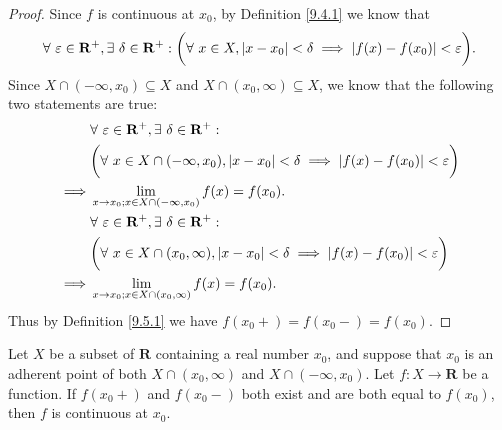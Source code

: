 \begin{proof}
    Since \(f\) is continuous at \(x_0\), by Definition \ref{9.4.1} we know that
    \[
        \forall\ \varepsilon \in \mathbf{R}^+, \exists\ \delta \in \mathbf{R}^+ : \bigg(\forall\ x \in X, \abs*{x - x_0} < \delta \implies \abs*{f(x) - f(x_0)} < \varepsilon\bigg).
    \]
    Since \(X \cap (-\infty, x_0) \subseteq X\) and \(X \cap (x_0, \infty) \subseteq X\), we know that the following two statements are true:
    \begin{align*}
                 & \forall\ \varepsilon \in \mathbf{R}^+, \exists\ \delta \in \mathbf{R}^+ :                                             \\
                 & \bigg(\forall\ x \in X \cap (-\infty, x_0), \abs*{x - x_0} < \delta \implies \abs*{f(x) - f(x_0)} < \varepsilon\bigg) \\
        \implies & \lim_{x \to x_0 ; x \in X \cap (-\infty, x_0)} f(x) = f(x_0).                                                         \\
                 & \forall\ \varepsilon \in \mathbf{R}^+, \exists\ \delta \in \mathbf{R}^+ :                                             \\
                 & \bigg(\forall\ x \in X \cap (x_0, \infty), \abs*{x - x_0} < \delta \implies \abs*{f(x) - f(x_0)} < \varepsilon\bigg)  \\
        \implies & \lim_{x \to x_0 ; x \in X \cap (x_0, \infty)} f(x) = f(x_0).
    \end{align*}
    Thus by Definition \ref{9.5.1} we have \(f(x_0+) = f(x_0-) = f(x_0)\).
\end{proof}

\setcounter{theorem}{2}
\begin{proposition}\label{9.5.3}
    Let \(X\) be a subset of \(\mathbf{R}\) containing a real number \(x_0\), and suppose that \(x_0\) is an adherent point of both \(X \cap (x_0, \infty)\) and \(X \cap (-\infty, x_0)\).
    Let \(f : X \to \mathbf{R}\) be a function.
    If \(f(x_0+)\) and \(f(x_0-)\) both exist and are both equal to \(f(x_0)\), then \(f\) is continuous at \(x_0\).
\end{proposition}

